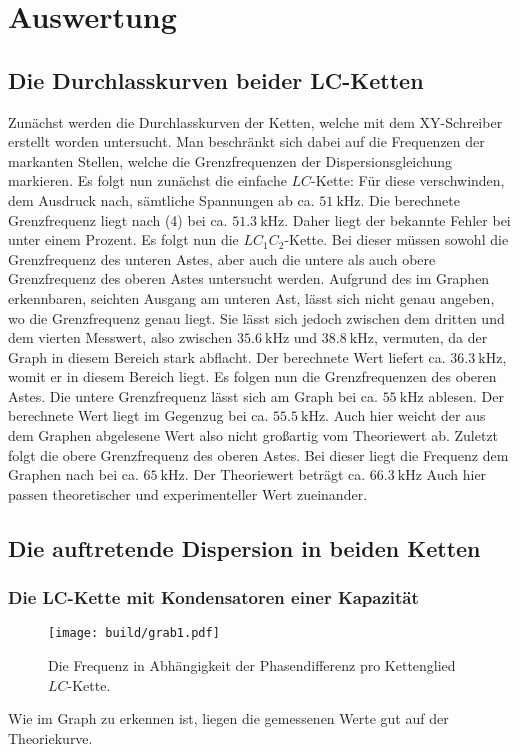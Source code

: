 
\section{Auswertung}
\label{sec:Auswertung}
\subsection{Die Durchlasskurven beider LC-Ketten}
Zunächst werden die Durchlasskurven der Ketten, welche mit dem XY-Schreiber
 erstellt worden untersucht. Man beschränkt sich dabei auf die Frequenzen der
  markanten Stellen, welche die Grenzfrequenzen der Dispersionsgleichung
	 markieren. Es folgt nun zunächst die einfache $LC$-Kette:
	 Für diese verschwinden, dem Ausdruck nach, sämtliche Spannungen ab ca.
	  $\SI{51}{\kilo\hertz}$. Die berechnete Grenzfrequenz liegt nach (4) bei
		 ca. $\SI{51,3}{\kilo\hertz}$. Daher liegt der bekannte Fehler bei
		  unter einem Prozent. Es folgt nun die $LC_1C_2$-Kette. Bei dieser müssen
			 sowohl die Grenzfrequenz des unteren Astes, aber auch die untere als auch obere Grenzfrequenz des
			  oberen Astes untersucht werden. Aufgrund des im Graphen erkennbaren, seichten
				Ausgang am unteren Ast, lässt sich nicht genau angeben, wo die
				 Grenzfrequenz genau liegt. Sie lässt sich jedoch zwischen dem dritten
				  und dem vierten Messwert, also zwischen $\SI{35,6}{\kilo\hertz}$ und
					$\SI{38,8}{\kilo\hertz}$, vermuten, da der Graph in diesem Bereich
					 stark abflacht. Der berechnete Wert liefert ca. $\SI{36,3}{\kilo\hertz}$,
					  womit er in diesem Bereich liegt.
						 Es folgen nun die Grenzfrequenzen des oberen Astes. Die
						  untere Grenzfrequenz lässt sich am Graph bei ca. $\SI{55}{\kilo\hertz}$
							ablesen. Der berechnete Wert liegt im Gegenzug bei
							 ca. $\SI{55,5}{\kilo\hertz}$. Auch hier weicht der aus dem Graphen abgelesene Wert also nicht
							 großartig vom Theoriewert ab. Zuletzt folgt die obere Grenzfrequenz
							 des oberen Astes. Bei dieser liegt die Frequenz dem Graphen nach bei ca.
							  $\SI{65}{\kilo\hertz}$. Der Theoriewert beträgt ca. $\SI{66,3}{\kilo\hertz}$
								Auch hier passen theoretischer und experimenteller Wert zueinander.


\subsection{Die auftretende Dispersion in beiden Ketten}
\subsubsection{Die LC-Kette mit Kondensatoren einer Kapazität}
\begin{figure}[H]
	\centering
	\caption{Die Frequenz in Abhängigkeit der Phasendifferenz pro Kettenglied $LC$-Kette.}
	\texttt{[image: build/grab1.pdf]}
	\label{fig:grab1}
\end{figure}

Wie im Graph zu erkennen ist, liegen die gemessenen Werte gut auf der Theoriekurve.

